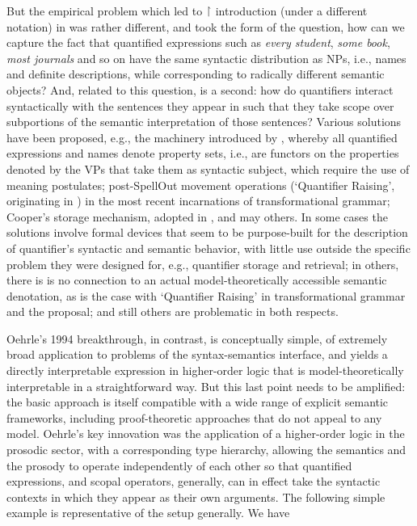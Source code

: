 \documentclass[output=paper,colorlinks,citecolor=brown]{langscibook}
\begin{document}
But the empirical problem which led to \ensuremath{\vs} introduction (under a different
notation) in \citet{oehrle1994} was rather different, and took the form of
the question, how can we capture the fact that quantified expressions
such as \textit{every student}, \textit{some book}, \textit{most journals} and so on have
the same syntactic distribution as NPs, i.e., names and definite
descriptions, while corresponding to radically different semantic
objects? And, related to this question, is a second: how do
quantifiers interact syntactically with the sentences they appear in
such that they take scope over subportions of the semantic
interpretation of those sentences? Various solutions have been
proposed, e.g., the machinery introduced by \citet{montague1973a}, whereby all quantified expressions and
names denote property sets, i.e., are functors on the properties
denoted by the VPs that take them as syntactic subject, which require
the use of meaning postulates; post-SpellOut
movement operations (`Quantifier Raising', originating in
\citet{may_r1985a}) in the most recent incarnations of transformational
grammar; Cooper's \citeyearpar{cooper75,Cooper83}
storage mechanism, adopted in \citet{pollardsag94}, and may others. In
some cases the solutions involve formal devices that seem to be
purpose-built for the description of quantifier's syntactic and
semantic behavior, with little use outside the specific problem they
were designed for, e.g., quantifier storage and retrieval; in others,
there is is no connection to an actual model-theoretically accessible
semantic denotation, as is the case with `Quantifier Raising' in
transformational grammar and the \citet{pollardsag94} proposal; and still
others are problematic in both respects.

Oehrle's 1994 breakthrough, in contrast, is conceptually simple, of
extremely broad application to problems of the syntax-semantics
interface, and yields a directly interpretable expression in
higher-order logic that is model-theoretically interpretable in a
straightforward way. But this last point needs to be amplified: the
basic approach is itself compatible with a wide range of explicit
semantic frameworks, including proof-theoretic approaches that do not
appeal to any model. Oehrle's key innovation was the application of a
higher-order logic in the prosodic sector, with a corresponding type
hierarchy, allowing the semantics and the prosody to operate
independently of each other so that quantified expressions, and scopal
operators, generally, can in effect take the syntactic contexts in
which they appear as their own arguments. The following simple example
is representative of the setup generally. We have
\end{document}

